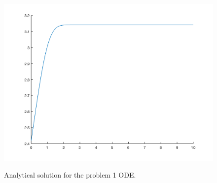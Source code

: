 \documentclass[12pt]{article}
\begin{document}
\begin{figure}[h!]
    \centering
    {{\includegraphics[width=15cm]{problem_1_analytical_sol.png}}}%
    \qquad
    \caption{Analytical solution for the problem 1 ODE.}%
    \label{fig:example}%
\end{figure}
\end{document}
